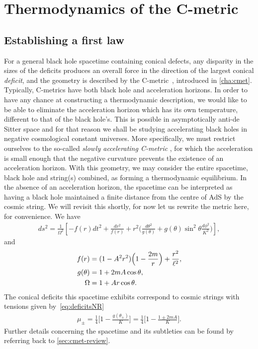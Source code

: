\documentclass[
twoside,
openright,
frontopenright,
]{dmathesis}
\newcommand{\nn}{\nonumber}
\begin{document}
\section{Thermodynamics of the C-metric}

\subsection{Establishing a first law}

For a general black hole spacetime containing conical defects, any disparity in
the sizes of the deficits produces an overall force in the direction of the
largest conical \emph{deficit}, and the geometry is described by the
C-metric~\cite{Kinnersley:1970zw}, introduced in \cref{cha:cmet}. Typically,
C-metrics have both black hole and acceleration horizons. In order to have any
chance at constructing a thermodynamic description, we would like to be able to
eliminate the acceleration horizon which has its own temperature, different to
that of the black hole's. This is possible in asymptotically anti-de Sitter
space and for that reason we shall be studying accelerating black holes in
negative cosmological constant universes. More specifically, we must restrict
ourselves to the so-called \emph{slowly accelerating C-metric}
\cite{Podolsky:2002nk}, for which the acceleration is small enough that the
negative curvature prevents the existence of an acceleration horizon. With this
geometry, we may consider the entire spacetime, black hole and string(s)
combined, as forming a thermodynamic equilibrium. In the absence of an
acceleration horizon, the spacetime can be interpreted as having a black hole
maintained a finite distance from the centre of AdS by the cosmic string. We
will revisit this shortly, for now let us rewrite the metric here, for
convenience. We have
\begin{align}
  ds^2=\frac{1}{\Omega^2}\left[ -
  f(r) dt^2
  +\frac{dr^2}{f(r)} + r^2 \Big( \frac{d\theta^2}{g(\theta)} 
  + g(\theta)\sin^2\theta \frac{d\phi^2}{K^2}\Big)\right],
  \label{eq:cmetric3}
\end{align}
and
\begin{align}
f(r)&=(1-A^2r^2)\Bigl(1-\frac{2 m}{r}\Bigr)
+\frac{r^2}{\ell^2},\\
  g(\theta)&=1+2mA \cos\theta,\nn\\
  \Omega&=1+Ar\cos\theta.
\label{eq:cmetric3-fun}
\end{align}
The conical deficits this spacetime exhibits correspond to cosmic strings with
tensions given by~\eqref{eq:deficitsNR}
\begin{align}
  \label{eq:tensionsNR}
  \mu_\pm=\frac14\bigg[1-\frac{g(\theta_\pm)}{K}\bigg] = \frac14\bigg[1-\frac{1\pm
  2mA}{K}\bigg]. 
\end{align} 
Further details concerning the spacetime and its subtleties can be found by
referring back to \cref{sec:cmet-review}. 
\end{document}
